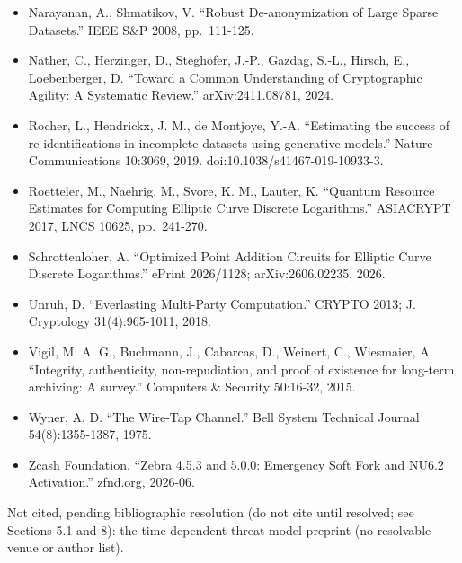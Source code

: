\documentclass[
]{llncs}
\begin{document}
\begin{itemize}
  Global Risk Institute / evolutionQ, 2025 (GRI publication page posted
  2026-03-09).
\item
  Narayanan, A., Shmatikov, V. ``Robust De-anonymization of Large Sparse
  Datasets.'' IEEE S\&P 2008, pp.~111-125.
\item
  Näther, C., Herzinger, D., Steghöfer, J.-P., Gazdag, S.-L., Hirsch,
  E., Loebenberger, D. ``Toward a Common Understanding of Cryptographic
  Agility: A Systematic Review.'' arXiv:2411.08781, 2024.
\item
  Rocher, L., Hendrickx, J. M., de Montjoye, Y.-A. ``Estimating the
  success of re-identifications in incomplete datasets using generative
  models.'' Nature Communications 10:3069, 2019.
  doi:10.1038/s41467-019-10933-3.
\item
  Roetteler, M., Naehrig, M., Svore, K. M., Lauter, K. ``Quantum
  Resource Estimates for Computing Elliptic Curve Discrete Logarithms.''
  ASIACRYPT 2017, LNCS 10625, pp.~241-270.
\item
  Schrottenloher, A. ``Optimized Point Addition Circuits for Elliptic
  Curve Discrete Logarithms.'' ePrint 2026/1128; arXiv:2606.02235, 2026.
\item
  Unruh, D. ``Everlasting Multi-Party Computation.'' CRYPTO 2013; J.
  Cryptology 31(4):965-1011, 2018.
\item
  Vigil, M. A. G., Buchmann, J., Cabarcas, D., Weinert, C., Wiesmaier,
  A. ``Integrity, authenticity, non-repudiation, and proof of existence
  for long-term archiving: A survey.'' Computers \& Security 50:16-32,
  2015.
\item
  Wyner, A. D. ``The Wire-Tap Channel.'' Bell System Technical Journal
  54(8):1355-1387, 1975.
\item
  Zcash Foundation. ``Zebra 4.5.3 and 5.0.0: Emergency Soft Fork and
  NU6.2 Activation.'' zfnd.org, 2026-06.
\end{itemize}

Not cited, pending bibliographic resolution (do not cite until resolved;
see Sections 5.1 and 8): the time-dependent threat-model preprint (no
resolvable venue or author list).
\end{document}
